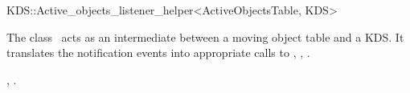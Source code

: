 

\begin{ccRefClass}{KDS::Active_objects_listener_helper<ActiveObjectsTable, KDS>}  %


\ccDefinition
  
The class \ccRefName\ acts as an intermediate between a moving object
table and a KDS. It translates the
 notification events into
appropriate calls to , ,
.



\ccSeeAlso

,
.


\end{ccRefClass}


